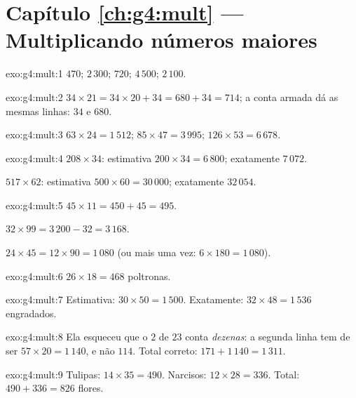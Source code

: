 \section*{Capítulo \ref{ch:g4:mult} --- Multiplicando números maiores}

\begin{solution}{exo:g4:mult:1}
$470$; \quad $2\,300$; \quad $720$; \quad $4\,500$; \quad
$2\,100$.
\end{solution}

\begin{solution}{exo:g4:mult:2}
$34 \times 21 = 34 \times 20 + 34 = 680 + 34 = 714$; a conta armada
dá as mesmas linhas: $34$ e $680$.
\end{solution}

\begin{solution}{exo:g4:mult:3}
$63 \times 24 = 1\,512$; \quad
$85 \times 47 = 3\,995$; \quad
$126 \times 53 = 6\,678$.
\end{solution}

\begin{solution}{exo:g4:mult:4}
$208 \times 34$: estimativa $200 \times 34 = 6\,800$; exatamente
$7\,072$.

$517 \times 62$: estimativa $500 \times 60 = 30\,000$; exatamente
$32\,054$.
\end{solution}

\begin{solution}{exo:g4:mult:5}
$45 \times 11 = 450 + 45 = 495$.

$32 \times 99 = 3\,200 - 32 = 3\,168$.

$24 \times 45 = 12 \times 90 = 1\,080$ (ou mais uma vez:
$6 \times 180 = 1\,080$).
\end{solution}

\begin{solution}{exo:g4:mult:6}
$26 \times 18 = 468$ poltronas.
\end{solution}

\begin{solution}{exo:g4:mult:7}
Estimativa: $30 \times 50 = 1\,500$. Exatamente:
$32 \times 48 = 1\,536$ engradados.
\end{solution}

\begin{solution}{exo:g4:mult:8}
Ela esqueceu que o $2$ de $23$ conta \emph{dezenas}: a segunda linha
tem de ser $57 \times 20 = 1\,140$, e não $114$. Total correto:
$171 + 1\,140 = 1\,311$.
\end{solution}

\begin{solution}{exo:g4:mult:9}
Tulipas: $14 \times 35 = 490$. Narcisos: $12 \times 28 = 336$.
Total: $490 + 336 = 826$ flores.
\end{solution}


